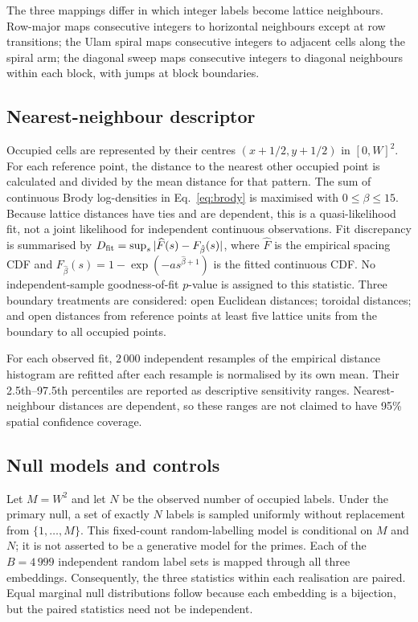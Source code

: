 \documentclass[final,1p,times,authoryear]{elsarticle}
\theoremstyle{definition}
\begin{document}
The three mappings differ in which integer labels become lattice neighbours.
Row-major maps consecutive integers to horizontal neighbours except at row
transitions; the Ulam spiral maps consecutive integers to adjacent cells along
the spiral arm; the diagonal sweep maps consecutive integers to diagonal
neighbours within each block, with jumps at block boundaries.

\subsection{Nearest-neighbour descriptor}

Occupied cells are represented by their centres $(x+1/2,y+1/2)$ in
$[0,W]^2$. For each reference point, the distance to the nearest other
occupied point is calculated and divided by the mean distance for that
pattern. The sum of continuous Brody log-densities in
Eq.~\eqref{eq:brody} is maximised with $0\le\beta\le15$. Because lattice
distances have ties and are dependent, this is a quasi-likelihood fit, not a
joint likelihood for independent continuous observations. Fit discrepancy is
summarised by $D_{\rm fit}=\sup_s|\widehat F(s)-F_{\hat\beta}(s)|$, where
$\widehat F$ is the empirical spacing CDF and
$F_{\hat\beta}(s)=1-\exp(-as^{\hat\beta+1})$ is the fitted continuous CDF.
No independent-sample goodness-of-fit $p$-value is assigned to this statistic.
Three boundary treatments are considered: open Euclidean
distances; toroidal distances; and open distances from reference points at
least five lattice units from the boundary to all occupied points.

For each observed fit, $2\,000$ independent resamples of the empirical
distance histogram are refitted after each resample is normalised by its own
mean. Their 2.5th--97.5th percentiles are reported as descriptive sensitivity
ranges. Nearest-neighbour distances are dependent, so these ranges are not
claimed to have 95\% spatial confidence coverage.

\subsection{Null models and controls}

Let $M=W^2$ and let $N$ be the observed number of occupied labels. Under the
primary null, a set of exactly $N$ labels is sampled uniformly without
replacement from $\{1,\ldots,M\}$. This fixed-count random-labelling model is
conditional on $M$ and $N$; it is not asserted to be a generative model for
the primes. Each of the $B=4\,999$ independent random label sets is mapped
through all three embeddings. Consequently, the three statistics within each
realisation are paired. Equal marginal null distributions follow because each
embedding is a bijection, but the paired statistics need not be independent.
\end{document}
